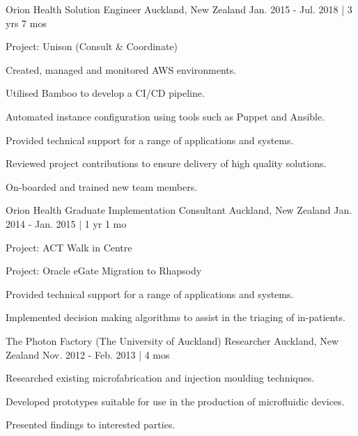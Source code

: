 \begin{cventries}
\cventry
{Orion Health} %
{Solution Engineer} %
{Auckland, New Zealand} %
{Jan. 2015 - Jul. 2018 | 3 yrs 7 mos} %
{ %
\begin{cvitems}
\item {Project: Unison (Consult \& Coordinate)}
\item {Created, managed and monitored AWS environments.}
\item {Utilised Bamboo to develop a CI/CD pipeline.}
\item {Automated instance configuration using tools such as Puppet and }Ansible.
\item {Provided technical support for a range of applications and }systems.
\item {Reviewed project contributions to ensure delivery of high quality }solutions.
\item {On-boarded and trained new team members.}
\end{cvitems}
}


\cventry
{Orion Health} %
{Graduate Implementation Consultant} %
{Auckland, New Zealand} %
{Jan. 2014 - Jan. 2015 | 1 yr 1 mo} %
{ %
\begin{cvitems}
\item {Project: ACT Walk in Centre}
\item {Project: Oracle eGate Migration to Rhapsody}
\item {Provided technical support for a range of applications and systems.}
\item {Implemented decision making algorithms to assist in the triaging of in-patients.}
\end{cvitems}
}


\cventry
{The Photon Factory (The University of Auckland)} %
{Researcher} %
{Auckland, New Zealand} %
{Nov. 2012 - Feb. 2013 | 4 mos} %
{ %
\begin{cvitems}
\item {Researched existing microfabrication and injection moulding techniques.}
\item {Developed prototypes suitable for use in the production of microfluidic devices.}
\item {Presented findings to interested parties.}
\end{cvitems}
}


\end{cventries}
